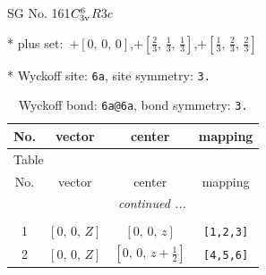\documentclass[fleqn,8pt]{jsarticle}
\begin{document}
\setcounter{MaxMatrixCols}{32}

\renewcommand{\tablename}{Table~}
\renewcommand{\figurename}{Figure~}
\begin{center}
\LARGE
SG No. 161\quad$C_{\rm 3v}^{6}$\quad$R3c$\quad[ trigonal ]
\end{center}

* plus set:\,\,\,$+\left[ 0,\, 0,\, 0 \right]$,\quad $+\left[ \frac{2}{3},\, \frac{1}{3},\, \frac{1}{3} \right]$,\quad $+\left[ \frac{1}{3},\, \frac{2}{3},\, \frac{2}{3} \right]$


* Wyckoff site: {\tt 6a}, site symmetry: {\tt 3.}
\renewcommand{\arraystretch}{1.2}
\begin{longtable}{cccc}
\caption{Wyckoff bond: {\tt 6a@6a}, bond symmetry: {\tt 3.}}
 \\
 \hline \hline
No. & vector & center & mapping \\ \hline \endfirsthead

\multicolumn{3}{l}{\tablename\ \thetable{}} \\
 \hline \hline
No. & vector & center & mapping \\ \hline \endhead

 \hline \hline
\multicolumn{3}{r}{\footnotesize\it continued ...} \\ \endfoot

 \hline \hline
\multicolumn{3}{r}{} \\ \endlastfoot

1 & $\left[ 0,\, 0,\, Z \right]$ & $\left[ 0,\, 0,\, z \right]$ & {\tt [1,2,3]} \\ \hline
2 & $\left[ 0,\, 0,\, Z \right]$ & $\left[ 0,\, 0,\, z + \frac{1}{2} \right]$ & {\tt [4,5,6]} \\
\end{longtable}
\renewcommand{\arraystretch}{1.2}
\end{document}
